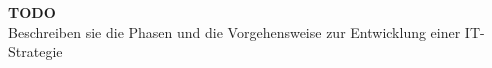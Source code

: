 \textbf{TODO}\\
Beschreiben sie die Phasen und die Vorgehensweise zur Entwicklung einer IT-Strategie\\\\